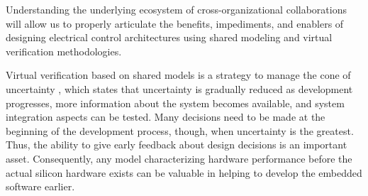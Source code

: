 Understanding the underlying ecosystem of cross-organizational collaborations will allow us to properly articulate the benefits, impediments, and enablers of designing electrical control architectures using shared modeling and virtual verification methodologies.

Virtual verification based on shared models is a strategy to manage the cone of uncertainty \cite{Boehm1981}, 
which states that uncertainty is gradually reduced as development progresses,
more information about the system becomes available,
and system integration aspects can be tested.
Many decisions need to be made at the beginning of the development process, though, when uncertainty is the greatest.
Thus, the ability to give early feedback about design decisions is an important asset.
Consequently, any model characterizing hardware performance before the actual silicon hardware exists can be valuable in helping to develop the embedded software earlier.

